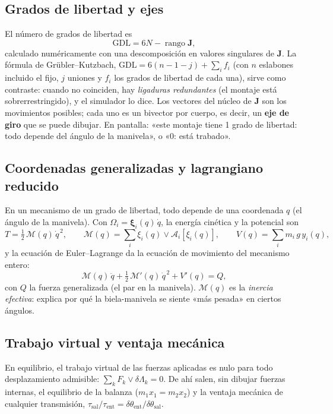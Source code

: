 \documentclass[11pt,a4paper]{article}
\numberwithin{equation}{section}
\newcommand{\vect}[1]{\bm{#1}}
\begin{document}
\subsection{Grados de libertad y ejes}
El número de grados de libertad es
\begin{equation}
  \text{GDL} = 6N - \operatorname{rango}\mathbf{J},
\end{equation}
calculado numéricamente con una descomposición en valores singulares de $\mathbf{J}$. La fórmula de
Grübler–Kutzbach, $\text{GDL} = 6(n - 1 - j) + \sum_i f_i$ (con $n$ eslabones incluido el fijo, $j$ uniones y $f_i$
los grados de libertad de cada una), sirve como contraste: cuando no coinciden, hay \emph{ligaduras redundantes} (el
montaje está sobrerrestringido), y el simulador lo dice. Los vectores del núcleo de $\mathbf{J}$ son los movimientos
posibles; cada uno es un bivector por cuerpo, es decir, un \textbf{eje de giro} que se puede dibujar. En pantalla:
«este montaje tiene 1 grado de libertad: todo depende del ángulo de la manivela», o «0: está trabado».

\subsection{Coordenadas generalizadas y lagrangiano reducido}
En un mecanismo de un grado de libertad, todo depende de una coordenada $q$ (el ángulo de la manivela). Con
$\Omega_i = \vect{\xi}_i(q)\,\dot q$, la energía cinética y la potencial son
\begin{equation}
  T = \tfrac12\,\mathcal{M}(q)\,\dot q^{\,2},\qquad \mathcal{M}(q) = \sum_i \xi_i(q)\vee\mathcal{A}_i[\xi_i(q)],\qquad
  V(q) = \sum_i m_i\,g\,y_i(q),
\end{equation}
y la ecuación de Euler–Lagrange da la ecuación de movimiento del mecanismo entero:
\begin{equation}
  \mathcal{M}(q)\,\ddot q + \tfrac12\,\mathcal{M}'(q)\,\dot q^{\,2} + V'(q) = Q,
\end{equation}
con $Q$ la fuerza generalizada (el par en la manivela). $\mathcal{M}(q)$ es la \emph{inercia efectiva}: explica por
qué la biela-manivela se siente «más pesada» en ciertos ángulos.

\subsection{Trabajo virtual y ventaja mecánica}
En equilibrio, el trabajo virtual de las fuerzas aplicadas es nulo para todo desplazamiento admisible:
$\sum_k F_k\vee\delta\Lambda_k = 0$. De ahí salen, sin dibujar fuerzas internas, el equilibrio de la balanza
($m_1x_1 = m_2x_2$) y la ventaja mecánica de cualquier transmisión,
$\tau_{\text{sal}}/\tau_{\text{ent}} = \delta\theta_{\text{ent}}/\delta\theta_{\text{sal}}$.
\end{document}
